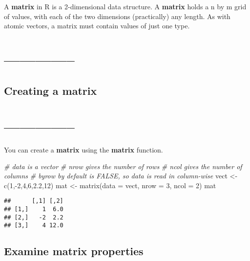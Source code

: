 \documentclass[
]{article}
\newenvironment{Shaded}{\begin{snugshade}}{\end{snugshade}}
\newcommand{\AttributeTok}[1]{\textcolor[rgb]{0.77,0.63,0.00}{#1}}
\newcommand{\CommentTok}[1]{\textcolor[rgb]{0.56,0.35,0.01}{\textit{#1}}}
\newcommand{\DecValTok}[1]{\textcolor[rgb]{0.00,0.00,0.81}{#1}}
\newcommand{\FloatTok}[1]{\textcolor[rgb]{0.00,0.00,0.81}{#1}}
\newcommand{\FunctionTok}[1]{\textcolor[rgb]{0.00,0.00,0.00}{#1}}
\newcommand{\NormalTok}[1]{#1}
\newcommand{\OtherTok}[1]{\textcolor[rgb]{0.56,0.35,0.01}{#1}}
\newcommand{\SpecialCharTok}[1]{\textcolor[rgb]{0.00,0.00,0.00}{#1}}
\begin{document}
A \textbf{matrix} in R is a 2-dimensional data structure. A
\textbf{matrix} holds a n by m grid of values, with each of the two
dimensions (practically) any length. As with atomic vectors, a matrix
must contain values of just one type.

\hypertarget{section-28}{%
\section{--------------}\label{section-28}}

\hypertarget{creating-a-matrix}{%
\subsection{Creating a matrix}\label{creating-a-matrix}}

\hypertarget{section-29}{%
\section{--------------}\label{section-29}}

You can create a \textbf{matrix} using the \textbf{matrix} function.

\begin{Shaded}
\begin{Highlighting}[]
\CommentTok{\# \textquotesingle{}data\textquotesingle{} is a vector}
\CommentTok{\# \textquotesingle{}nrow\textquotesingle{} gives the number of rows}
\CommentTok{\# \textquotesingle{}ncol\textquotesingle{} gives the number of columns}
\CommentTok{\# \textquotesingle{}byrow\textquotesingle{} by default is FALSE, so data is read in column{-}wise}
\NormalTok{vect }\OtherTok{\textless{}{-}} \FunctionTok{c}\NormalTok{(}\DecValTok{1}\NormalTok{,}\SpecialCharTok{{-}}\DecValTok{2}\NormalTok{,}\DecValTok{4}\NormalTok{,}\DecValTok{6}\NormalTok{,}\FloatTok{2.2}\NormalTok{,}\DecValTok{12}\NormalTok{)}
\NormalTok{mat }\OtherTok{\textless{}{-}} \FunctionTok{matrix}\NormalTok{(}\AttributeTok{data =}\NormalTok{ vect, }\AttributeTok{nrow =} \DecValTok{3}\NormalTok{, }\AttributeTok{ncol =} \DecValTok{2}\NormalTok{)}
\NormalTok{mat}
\end{Highlighting}
\end{Shaded}

\begin{verbatim}
##      [,1] [,2]
## [1,]    1  6.0
## [2,]   -2  2.2
## [3,]    4 12.0
\end{verbatim}

\hypertarget{examine-matrix-properties}{%
\subsection{Examine matrix properties}\label{examine-matrix-properties}}
\end{document}
